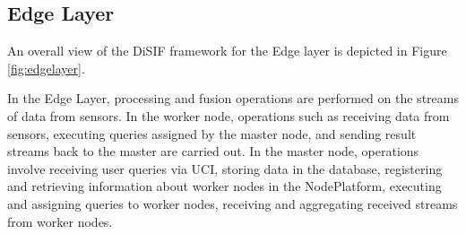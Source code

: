 \documentclass[5p,times]{elsarticle}
\begin{document}









    









\subsection{Edge Layer}






An overall view of the DiSIF framework for the Edge layer is depicted in Figure \ref{fig:edgelayer}.


In the Edge Layer, processing and fusion operations are performed on the streams of data from sensors.
 In the worker node, operations such as receiving data from sensors, executing queries assigned by the master node,
  and sending result streams back to the master are carried out. In the master node, operations involve
   receiving user queries via UCI, storing data in the database, registering and retrieving information about
    worker nodes in the NodePlatform, executing and assigning queries to worker nodes,
     receiving and aggregating received streams from worker nodes.
\end{document}
